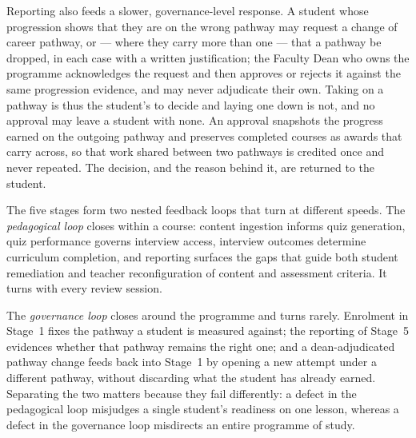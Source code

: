 \begin{enumerate}
    Reporting also feeds a slower, governance-level response. A
    student whose progression shows that they are on the wrong pathway
    may request a change of career pathway, or --- where they carry
    more than one --- that a pathway be dropped, in each case with a
    written justification; the Faculty Dean who owns the programme
    acknowledges the request and then approves or rejects it against
    the same progression evidence, and may never adjudicate their own.
    Taking on a pathway is thus the student's to decide and laying one
    down is not, and no approval may leave a student with none. An
    approval snapshots the progress earned on the outgoing pathway
    and preserves completed courses as awards that carry across, so
    that work shared between two pathways is credited once and
    never repeated. The decision, and the reason behind it, are returned to
    the student.

\end{enumerate}

The five stages form two nested feedback loops that turn at different
speeds. The \textit{pedagogical loop} closes within a course: content
ingestion informs quiz generation, quiz performance governs interview
access, interview outcomes determine curriculum completion, and
reporting surfaces the gaps that guide both student remediation and
teacher reconfiguration of content and assessment criteria. It turns
with every review session.

The \textit{governance loop} closes around the programme and turns rarely. Enrolment in Stage~1 fixes the pathway a student is measured against; the reporting of Stage~5 evidences whether that pathway remains the right one; and a dean-adjudicated pathway change feeds back into Stage~1 by opening a new attempt under a different pathway, without discarding what the student has already earned. Separating the two matters because they fail differently: a defect in the pedagogical loop misjudges a single student's readiness on one lesson, whereas a defect in the governance loop misdirects an entire programme of study.

